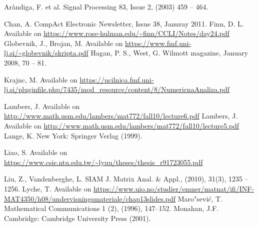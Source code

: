 \documentclass[a4paper,10pt]{article}
\begin{document}
\begin{thebibliography}{99}
%
Ar\`andiga, F. et al.
\newblock Signal Processing 83, Issue 2, (2003) 459 \--- 464.

%
Chan, A.
\newblock CompAct Electronic Newsletter, Issue 38, Januray 2011.
%
Finn, D. L.
\newblock Available on \url{https://www.rose-hulman.edu/~finn/CCLI/Notes/day24.pdf}
%
Globevnik, J., Brojan, M.
\newblock Available on \url{https://www.fmf.uni-lj.si/~globevnik/skripta.pdf}
%
Hagan, P. S., West, G.
\newblock Wilmott magazine, January 2008, 70 \--- 81.

%
Krajnc, M.
\newblock Available on \url{https://ucilnica.fmf.uni-lj.si/pluginfile.php/7435/mod_resource/content/8/NumericnaAnaliza.pdf}

%
Lambers, J.
\newblock Available on \url{http://www.math.usm.edu/lambers/mat772/fall10/lecture6.pdf}
%
Lambers, J.
\newblock Available on \url{http://www.math.usm.edu/lambers/mat772/fall10/lecture5.pdf}
%
Lange, K.
\newblock New York: Springer Verlag  (1999).

%
Liao, S.
\newblock Available on \url{https://www.csie.ntu.edu.tw/~lyuu/theses/thesis_r91723055.pdf}

%
Liu, Z., Vandenberghe, L.
\newblock SIAM J. Matrix Anal. \& Appl., (2010), 31(3), 1235 \---1256.
%
Lyche, T.
\newblock Available on \url{https://www.uio.no/studier/emner/matnat/ifi/INF-MAT4350/h08/undervisningsmateriale/chap13slides.pdf}
%
Maro"sevi\'c, T.
\newblock Mathematical Communications 1 (2), (1996), 147\---152.
%
Monahan, J.F.
\newblock Cambridge: Cambridge University Press (2001).


\end{thebibliography}
\end{document}
